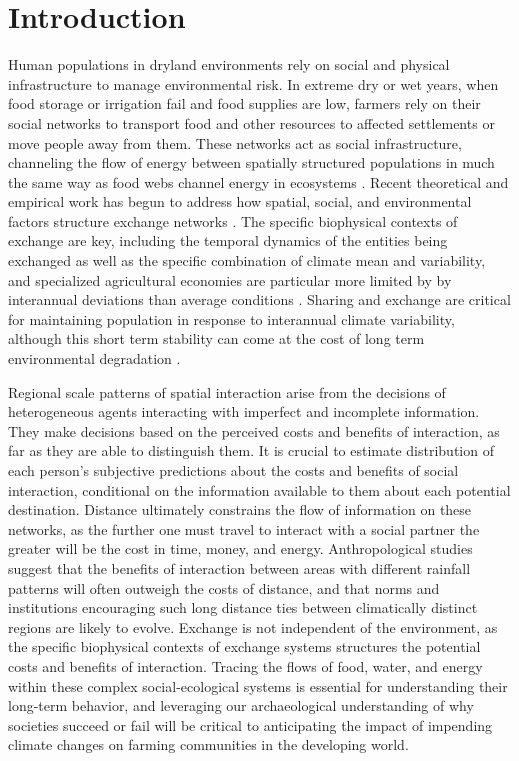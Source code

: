 \documentclass[10pt]{iopart}
\begin{document}
\section*{Introduction}
Human populations in dryland environments rely on social and physical infrastructure to manage environmental risk. In extreme dry or wet years, when food storage or irrigation fail and food supplies are low, farmers rely on their social networks to transport food and other resources to affected settlements or move people away from them. These networks act as social infrastructure, channeling the flow of energy between spatially structured populations in much the same way as food webs channel energy in ecosystems \parencite{Crabtree2017ReconstructingStates;Crabtree2015}. Recent theoretical and empirical work has begun to address how spatial, social, and environmental factors structure exchange networks \parencite{Nolin2010Food-SharingIndonesia,Koster2014,Hao2015,Schnegg2015}. The specific biophysical contexts of exchange are key, including the temporal dynamics of the entities being exchanged as well as the specific combination of climate mean and variability, and specialized agricultural economies are particular more limited by by interannual deviations than average conditions \parencite{Freeman2014}. Sharing and exchange are critical for maintaining population in response to interannual climate variability, although this short term stability can come at the cost of long term environmental degradation \parencite{Janssen2010}.

Regional scale patterns of spatial interaction arise from the decisions of heterogeneous agents interacting with imperfect and incomplete information. They make decisions based on the perceived costs and benefits of interaction, as far as they are able to distinguish them. It is crucial to estimate distribution of each person's subjective predictions about the costs and benefits of social interaction, conditional on the information available to them about each potential destination. Distance ultimately constrains the flow of information on these networks, as the further one must travel to interact with a social partner the greater will be the cost in time, money, and energy. Anthropological studies suggest that the benefits of interaction between areas with different rainfall patterns will often outweigh the costs of distance, and that norms and institutions encouraging such long distance ties between climatically distinct regions are likely to evolve. Exchange is not independent of the environment, as the specific biophysical contexts of exchange systems structures the potential costs and benefits of interaction. Tracing the flows of food, water, and energy within these complex social-ecological systems is essential for understanding their long-term behavior, and leveraging our archaeological understanding of why societies succeed or fail will be critical to anticipating the impact of impending climate changes on farming communities in the developing world.
\end{document}
